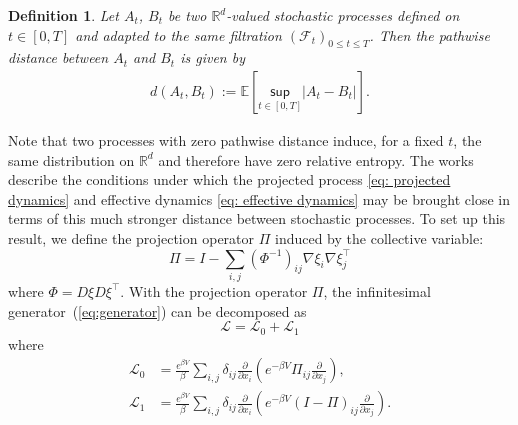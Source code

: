 \documentclass[reqno, 12pt]{article}
\newtheorem{definition}{Definition}
\begin{document}
\begin{definition}
Let $A_t$, $B_t$ be two $\mathbb{R}^d$-valued stochastic processes defined on $t \in [0,T]$ and adapted to the same filtration $\left(\mathcal{F}_{t}\right)_{0 \leq t \leq T}$. Then the pathwise distance between $A_t$ and $B_t$ is given by
\begin{align}
    d(A_t, B_t) := \mathbb{E}\left[\underset{t \in [0,T]}{\textsf{sup}}\left|A_t - B_t\right|\right]. \label{eq: pathwise distance}
\end{align}
\end{definition}
Note that two processes with zero pathwise distance induce, for a fixed $t$, the same distribution on $\mathbb{R}^d$ and therefore have zero relative entropy. The works \parencite{legoll2010effective,legoll2017pathwise,lelievre2019pathwise} describe the conditions under which the projected process \eqref{eq: projected dynamics} and effective dynamics \eqref{eq: effective dynamics} may be brought close in terms of this much stronger distance between stochastic processes. To set up this result, we define the projection operator $\Pi$ induced by the collective variable: 
\begin{equation}
    \Pi = I - \sum_{i,j} (\Phi^{-1})_{ij} \nabla \xi_i\nabla \xi_j^\top\label{eq: Pi}
\end{equation}
where $\Phi = D\xi D\xi^{\top}$. With the projection operator $\Pi$, the infinitesimal generator~(\ref{eq:generator}) can be decomposed as 
\begin{equation}
    \mathcal{L} = \mathcal{L}_0 + \mathcal{L}_1
\end{equation}
where 
\begin{align}
    \mathcal{L}_0 & = \frac{e^{\beta V}}{ \beta} \sum_{i,j} \delta_{ij}\frac{\partial}{\partial x_i} \left( e^{-\beta V} \Pi_{ij} \frac{\partial}{\partial x_j}\right), \\
    \mathcal{L}_1 & = \frac{e^{\beta V}}{ \beta} \sum_{i,j} \delta_{ij}\frac{\partial}{\partial x_i} \left( e^{-\beta V} (I - \Pi)_{ij} \frac{\partial}{\partial x_j}\right). 
\end{align}
\end{document}
